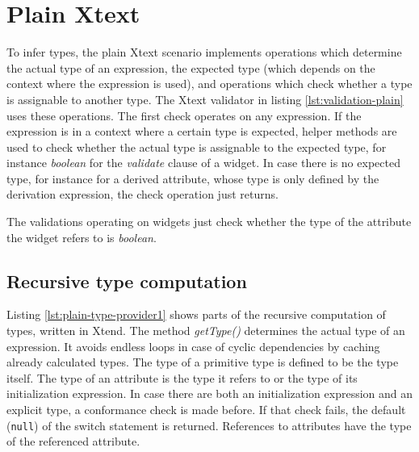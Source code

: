 \section{Plain Xtext}

To infer types, the plain Xtext scenario implements operations which determine the actual type of an expression, the expected type (which depends on the context where the expression is used), and operations which check whether a type is assignable to another type. The Xtext validator in listing \ref{lst:validation-plain} uses these operations. The first check operates on any expression. If the expression is in a context where a certain type is expected, helper methods are used to check whether the actual type is assignable to the expected type, for instance \emph{boolean} for the \emph{validate} clause of a widget. 
In case there is no expected type, for instance for a derived attribute, whose type is only defined by the derivation expression, the check operation just returns.

The validations operating on widgets just check whether the type of the attribute the widget refers to is \emph{boolean}.




\subsection{Recursive type computation}

Listing \ref{lst:plain-type-provider1} shows parts of the recursive computation of types, written in Xtend. The method \emph{getType()} determines the actual type of an expression. It avoids endless loops in case of cyclic dependencies by caching already calculated types. The type of a primitive type is defined to be the type itself. The type of an attribute is the type it refers to or the type of its initialization expression. In case there are both an initialization expression and an explicit type, a conformance check is made before. If that check fails, the default (\verb|null|) of the switch statement is returned. References to attributes have the type of the referenced attribute. %

